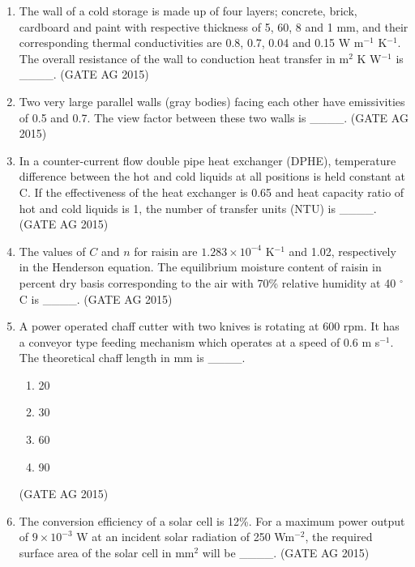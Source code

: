 \documentclass[journal,12pt,onecolumn]{IEEEtran}
\theoremstyle{remark}
\begin{document}
\begin{enumerate}
\item 
The wall of a cold storage is made up of four layers; concrete, brick, cardboard and paint with respective thickness of 5, 60, 8 and 1 mm, and their corresponding thermal conductivities are 0.8, 0.7, 0.04 and 0.15 W m$^{-1}$ K$^{-1}$. The overall resistance of the wall to conduction heat transfer in m$^{2}$ K W$^{-1}$ is \_\_\_\_.
\hfill{(GATE AG 2015)}

\item 
Two very large parallel walls (gray bodies) facing each other have emissivities of 0.5 and 0.7. The view factor between these two walls is \_\_\_\_.
\hfill{(GATE AG 2015)}

\item 
In a counter-current flow double pipe heat exchanger (DPHE), temperature difference between the hot and cold liquids at all positions is held constant at C. If the effectiveness of the heat exchanger is 0.65 and heat capacity ratio of hot and cold liquids is 1, the number of transfer units (NTU) is \_\_\_\_.
\hfill{(GATE AG 2015)}

\item 
The values of $C$ and $n$ for raisin are $1.283 \times 10^{-4}$ K$^{-1}$ and 1.02, respectively in the Henderson equation. The equilibrium moisture content of raisin in percent dry basis corresponding to the air with 70\% relative humidity at 40 $^{\circ}$C is \_\_\_\_.
\hfill{(GATE AG 2015)}

\item 
A power operated chaff cutter with two knives is rotating at 600 rpm. It has a conveyor type feeding mechanism which operates at a speed of 0.6 m s$^{-1}$. The theoretical chaff length in mm is \_\_\_\_.
\begin{multicols}{4}
\begin{enumerate}
    \item 20
    \item 30
    \item 60
    \item 90
\end{enumerate}
\end{multicols}
\hfill{(GATE AG 2015)}

\item 
The conversion efficiency of a solar cell is 12\%. For a maximum power output of $9 \times 10^{-3}$ W at an incident solar radiation of 250 Wm$^{-2}$, the required surface area of the solar cell in mm$^{2}$ will be \_\_\_\_.
\hfill{(GATE AG 2015)}


\end{enumerate}
\end{document}

